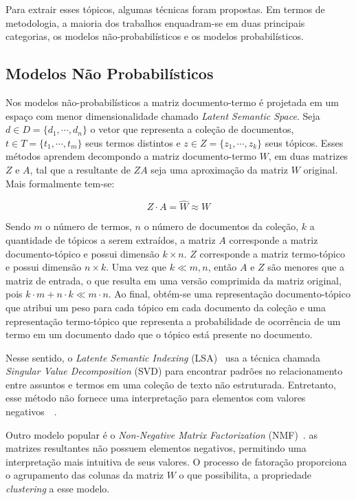 Para extrair esses tópicos, algumas técnicas foram propostas. Em termos de metodologia, a maioria dos trabalhos enquadram-se em duas principais categorias, os modelos não-probabilísticos e os modelos probabilísticos.


\subsection{Modelos Não Probabilísticos}

Nos modelos não-probabilísticos a matriz documento-termo é projetada em um espaço com menor dimensionalidade chamado \textit{Latent Semantic Space}. 
Seja
$d \in D = \{d_1,\cdots,d_n\}$ o vetor que representa a coleção de documentos, 
$t \in T = \{t_1,\cdots,t_m\}$ seus termos distintos e 
$z \in Z = \{z_1,\cdots,z_k\}$ seus tópicos. 
Esses métodos aprendem decompondo a matriz documento-termo $W$, em duas matrizes $Z$ e $A$, tal que a resultante de $ZA$ seja uma aproximação da matriz $W$ original. Mais formalmente tem-se:

\begin{equation}
	Z\cdot A = \hat{W} \approx W
\end{equation}

Sendo $m$ o número de termos, $n$ o número de documentos da coleção, $k$ a quantidade de tópicos a serem extraídos, a matriz $A$ corresponde a matriz documento-tópico e possui dimensão $k \times n$. $Z$ corresponde a matriz termo-tópico e possui dimensão $n \times k$. Uma vez que $k \ll m,n$, então $A$ e $Z$ são menores que a matriz de entrada, o que resulta em uma versão comprimida da matriz original, pois $k \cdot m + n \cdot k \ll m \cdot n$. Ao final, obtém-se uma representação documento-tópico que atribui um peso para cada tópico em cada documento da coleção e uma representação termo-tópico que representa a probabilidade de ocorrência de um termo em um documento dado que o tópico está presente no documento.

Nesse sentido, o \textit{Latente Semantic Indexing} (LSA)~\cite{Deerwester1990} usa a técnica chamada \textit{Singular Value Decomposition} (SVD) para encontrar padrões no relacionamento entre assuntos e termos em uma coleção de texto não estruturada. Entretanto, esse método não fornece uma interpretação para elementos com valores negativos~\cite{Deerwester1990}~\cite{Cheng2013}. %

Outro modelo popular é o \textit{Non-Negative Matrix Factorization} (NMF)~\cite{Lee1999}.  
as matrizes resultantes não possuem elementos negativos, permitindo uma interpretação mais intuitiva de seus valores. O processo de fatoração proporciona o agrupamento das colunas da matriz $W$ o que possibilita, a propriedade \textit{clustering} a esse modelo.


